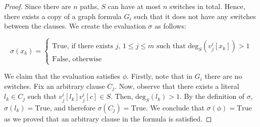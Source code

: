 \documentclass[en]{pracamgr}
\theoremstyle{definition}
\newcommand{\degree}[2]{\textrm{deg}_{#1}(#2)}
\newcommand{\true}{\textrm{True}}
\begin{document}
\begin{proof}
	Since there are $n$ paths, $S$ can have at most $n$ switches in total. Hence, there exists a copy of a graph formula $G_i$ such that it does not have any switches between the clauses. We create the evaluation $\sigma$ as follows:
	
	\begin{equation*}
	\sigma(x_k) = 
	\begin{cases}
	\textrm{True}\text{, if there exists $j$, $1 \leq j \leq m$ such that $\degree{S}{v^i_j[x_k]} > 1$} \\
	\textrm{False}\text{, otherwise}
	\end{cases}
	\end{equation*}
	
	\noindent
	We claim that the evaluation satisfies $\phi$. Firstly, note that in $G_i$ there are no switches. Fix an arbitrary clause $C_j$. Now, observe that there exists a literal $l_k \in C_j$ such that $v^i_j[l_k]v^i_j[c] \in S$. Then, $\degree{S}{l_k}>1$. By the definition of $\sigma$, $\sigma(l_k)=\true$, and therefore $\sigma(C_j)=\true$. We conclude that $\sigma(\phi)=\true$ as we proved that an arbitrary clause in the formula is satisfied.\qedhere
\end{proof}

 

\end{document}

